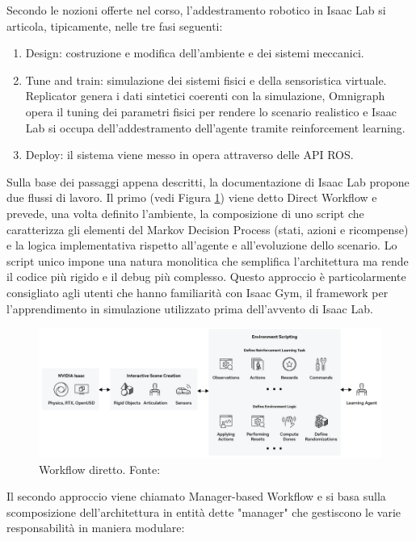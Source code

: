 Secondo le nozioni offerte nel corso, l'addestramento robotico in Isaac Lab si articola, tipicamente, nelle tre fasi seguenti:
\begin{enumerate}
    \item Design: costruzione e modifica dell'ambiente e dei sistemi meccanici.
    \item Tune and train: simulazione dei sistemi fisici e della sensoristica virtuale. Replicator genera i dati sintetici coerenti con la simulazione, Omnigraph opera il tuning dei parametri fisici per rendere lo scenario realistico e Isaac Lab si occupa dell'addestramento dell'agente tramite reinforcement learning.
    \item Deploy: il sistema viene messo in opera attraverso delle API ROS.
\end{enumerate}

Sulla base dei passaggi appena descritti, la documentazione di Isaac Lab propone due flussi di lavoro. Il primo (vedi Figura \ref{fig:isaac_lab_dir_wf}) viene detto Direct Workflow e prevede, una volta definito l'ambiente, la composizione di uno script che caratterizza gli elementi del Markov Decision Process (stati, azioni e ricompense) e la logica implementativa rispetto all'agente e all'evoluzione dello scenario. Lo script unico impone una natura monolitica che semplifica l'architettura ma rende il codice più rigido e il debug più complesso. Questo approccio è particolarmente consigliato agli utenti che hanno familiarità con Isaac Gym, il framework per l'apprendimento in simulazione utilizzato prima dell'avvento di Isaac Lab.

\begin{figure}[h]
    \centering
    \includegraphics[width=0.95\linewidth]{immagini/isaac_lab_dir_workflow.png}
    \caption{Workflow diretto. Fonte: \cite{nvidiaIsaacLab2025}}
    \label{fig:isaac_lab_dir_wf}
\end{figure}

Il secondo approccio viene chiamato Manager-based Workflow e si basa sulla scomposizione dell'architettura in entità dette "manager" che gestiscono le varie responsabilità in maniera modulare: 

